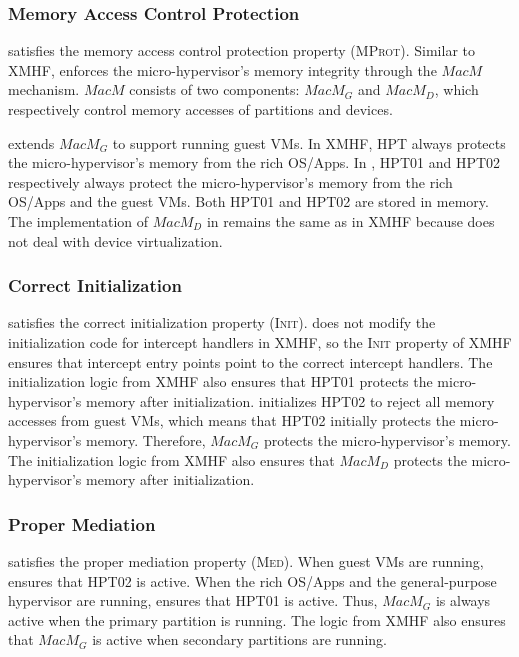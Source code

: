 \subsubsection{Memory Access Control Protection}

 satisfies the memory access control protection property (\textsc{MProt}). Similar to XMHF,  enforces the micro-hypervisor's memory integrity through the $MacM$ mechanism. $MacM$ consists of two components: $MacM_G$ and $MacM_D$, which respectively control memory accesses of  partitions and devices.

 extends $MacM_G$ to support running guest VMs. In XMHF, HPT always protects the micro-hypervisor's memory from the rich OS/Apps. In , HPT01 and HPT02 respectively always protect the micro-hypervisor's memory from the rich OS/Apps and the guest VMs. Both HPT01 and HPT02 are stored in  memory. The implementation of $MacM_D$ in  remains the same as in XMHF because  does not deal with device virtualization.

\subsubsection{Correct Initialization}

 satisfies the correct initialization property (\textsc{Init}).  does not modify the initialization code for intercept handlers in XMHF, so the \textsc{Init} property of XMHF ensures that intercept entry points point to the correct intercept handlers. The initialization logic from XMHF also ensures that HPT01 protects the micro-hypervisor's memory after initialization.  initializes HPT02 to reject all memory accesses from guest VMs, which means that HPT02 initially protects the micro-hypervisor's memory. Therefore, $MacM_G$ protects the micro-hypervisor's memory. The initialization logic from XMHF also ensures that $MacM_D$ protects the micro-hypervisor's memory after initialization.

\subsubsection{Proper Mediation}

 satisfies the proper mediation property (\textsc{Med}). When guest VMs are running,  ensures that HPT02 is active. When the rich OS/Apps and the general-purpose hypervisor are running,  ensures that HPT01 is active. Thus, $MacM_G$ is always active when the  primary partition is running. The logic from XMHF also ensures that $MacM_G$ is active when  secondary partitions are running.

